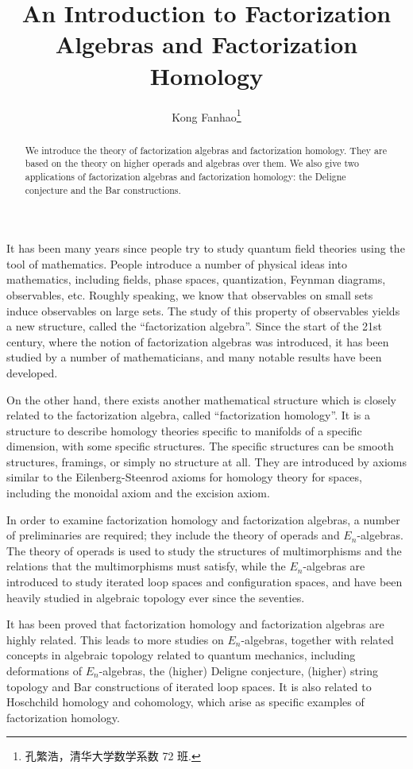 \documentclass[twoside]{article}
\begin{document}
\title{An Introduction to Factorization Algebras and Factorization Homology}
\author{Kong Fanhao\footnote{孔繁浩，清华大学数学系数 72 班.}}

\begin{abstract}
	We introduce the theory of factorization algebras and factorization homology.
    They are based on the theory on higher operads and algebras over them.
    We also give two applications of factorization algebras and factorization homology:
    the Deligne conjecture and the Bar constructions.
\end{abstract}

\tableofcontents

\clearpage

It has been many years since people try to study quantum field theories
using the tool of mathematics. People introduce a number of physical ideas into mathematics,
including fields, phase spaces, quantization, Feynman diagrams, observables,
etc. Roughly speaking, we know that observables on small sets induce
observables on large sets. The study of this property of observables
yields a new structure, called the ``factorization algebra''. Since the
start of the 21st century, where the notion of factorization algebras was
introduced, it has been studied by a number of mathematicians, and many
notable results have been developed.

On the other hand, there exists another mathematical structure which is 
closely related to the factorization algebra, called ``factorization
homology''. It is a structure to describe homology theories specific
to manifolds of a specific dimension, with some specific structures. 
The specific structures can be smooth structures, framings, or simply
no structure at all. They are introduced by axioms similar to the Eilenberg-Steenrod
axioms for homology theory for spaces, including the monoidal axiom and the
excision axiom.

In order to examine factorization homology and factorization algebras, 
a number of preliminaries are required; they include the theory of operads
and $E_n$-algebras. The theory of operads is used to study the structures of
multimorphisms and the relations that the multimorphisms must satisfy,
while the $E_n$-algebras are introduced to study iterated loop spaces and
configuration spaces, and have been heavily studied in algebraic topology
ever since the seventies. 

It has been proved that factorization homology and factorization algebras
are highly related. This leads to more studies on $E_n$-algebras, together
with related concepts in algebraic topology related to quantum mechanics, including
deformations of $E_n$-algebras, the (higher) Deligne conjecture, (higher) 
string topology and Bar constructions of iterated loop spaces. It is also
related to Hoschchild homology and cohomology, which arise as specific
examples of factorization homology.
\end{document}
